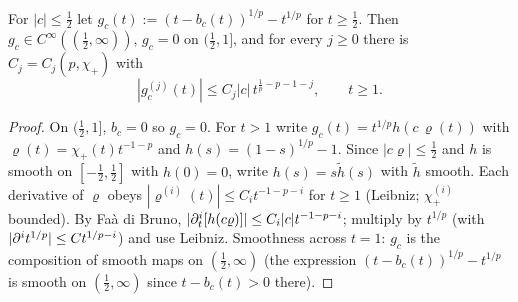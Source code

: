 \begin{lemma}
  \label{lem:c08_phi_integrand}
  For $|c|\le\frac12$ let $g_c(t):=(t-b_c(t))^{1/p}-t^{1/p}$ for $t\ge\frac12$. Then $g_c\in
  C^\infty((\frac12,\infty))$, $g_c=0$ on $(\frac12,1]$, and for every $j\ge0$ there is $C_j=C_j(p,\chi_+)$ with
  \[
    |g_c^{(j)}(t)|\le C_j|c|\,t^{\frac1p-p-1-j},\qquad t\ge1 .
  \]
\end{lemma}
\begin{proof}
  On $(\frac12,1]$, $b_c=0$ so $g_c=0$. For $t>1$ write $g_c(t)=t^{1/p}h(c\,\varrho(t))$ with
  $\varrho(t)=\chi_+(t)t^{-1-p}$ and $h(s)=(1-s)^{1/p}-1$. Since $|c\varrho|\le\frac12$ and $h$ is smooth on
  $[-\frac12,\frac12]$ with $h(0)=0$, write $h(s)=s\tilde h(s)$ with $\tilde h$ smooth. Each derivative of
  $\varrho$ obeys $|\varrho^{(i)}(t)|\le C_i t^{-1-p-i}$ for $t\ge1$ (Leibniz; $\chi_+^{(i)}$ bounded). By Faà di
  Bruno, $|\partial_t^i[h(c\varrho)]|\le C_i|c|t^{-1-p-i}$; multiply by $t^{1/p}$ (with $|\partial^i t^{1/p}|\le Ct^{1/p-i}$) and use
  Leibniz. Smoothness across $t=1$: $g_c$ is the composition of smooth maps on $(\frac12,\infty)$ (the
  expression $(t-b_c(t))^{1/p}-t^{1/p}$ is smooth on $(\frac12,\infty)$ since $t-b_c(t)>0$ there).
\end{proof}

